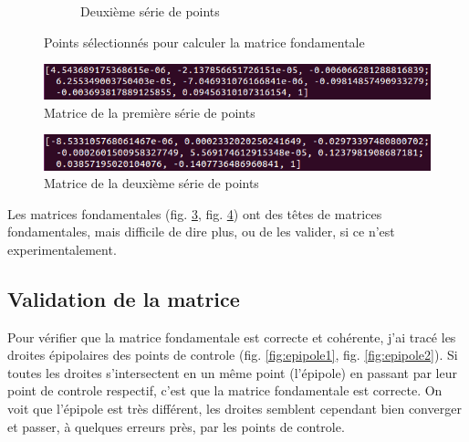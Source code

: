 \documentclass [a4 paper,11pt]{article}
\begin{document}
\begin{figure}
\begin{subfigure}{0.5\textwidth}
  \caption{Deuxième série de points}
  \label{fig:pts2}
\end{subfigure}
\caption{Points sélectionnés pour calculer la matrice fondamentale}
\label{fig:pts}
\end{figure}

\begin{figure}
  \centering
  \includegraphics[width=0.8\linewidth]{mat1.png}
  \caption{Matrice de la première série de points}
  \label{fig:mat1}
\end{figure}%

\begin{figure}
  \centering
  \includegraphics[width=0.8\linewidth]{mat2.png}
  \caption{Matrice de la deuxième série de points}
  \label{fig:mat2}
\end{figure}%

Les matrices fondamentales (fig. \ref{fig:mat1}, fig. \ref{fig:mat2}) ont des têtes de matrices fondamentales, mais difficile de dire plus, ou de les valider, si ce n'est experimentalement.

\newpage

\subsection{Validation de la matrice}
Pour vérifier que la matrice fondamentale est correcte et cohérente, j'ai tracé les droites épipolaires des points de controle (fig. \ref{fig:epipole1}, fig. \ref{fig:epipole2}). Si toutes les droites s'intersectent en un même point (l'épipole) en passant par leur point de controle respectif, c'est que la matrice fondamentale est correcte. On voit que l'épipole est très différent, les droites semblent cependant bien converger et passer, à quelques erreurs près, par les points de controle.
\end{document}
